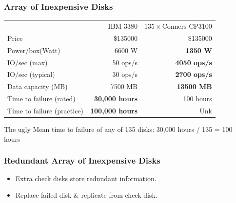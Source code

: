 \documentclass{beamer}
\begin{document}
\begin{frame}
    \frametitle{\textbf{Array} of Inexpensive Disks}
    \begin{tabular}{lrr}
        \tiny
        & IBM 3380 & $135 \times \text{Conners CP3100}$ \\
         Price &\$135000 & \$135000 \\
         Power/box(Watt) & 6600 W & \textbf{1350 W} \\
         IO/sec (max)& 50 ops/s& \textbf{4050 ops/s} \\
         IO/sec (typical)& 30 ops/s & \textbf{2700 ops/s} \\
         Data capacity (MB) & 7500 MB & \textbf{13500 MB} \\
         Time to failure (rated) & \textbf{30,000 hours} & 100 hours  \\
         Time to failure (practice) & \textbf{100,000 hours} & Unk \\
    \end{tabular}


    \begin{alertblock}{The ugly}
    Mean time to failure of any of 135 disks: 30,000 hours / 135 = 100 hours
    \end{alertblock}

\end{frame}

\begin{frame}
    \frametitle{\textbf{Redundant} Array of Inexpensive Disks}
    \begin{itemize}
        \item Extra check disks store redundant information.
        \item Replace failed disk \& replicate from check disk.
    \end{itemize}
\end{frame}
\end{document}
